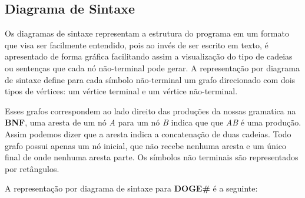 \documentclass{scrreprt}
\begin{document}
\subsection{Diagrama de Sintaxe}
Os diagramas de sintaxe representam a estrutura do programa em 
um formato que visa ser facilmente entendido, 
pois ao invés de ser escrito em texto, é apresentado de forma gráfica
facilitando assim a visualização do tipo de cadeias ou sentenças que 
cada nó não-terminal pode gerar. A representação por diagrama de sintaxe 
define para cada símbolo não-terminal um grafo direcionado com dois tipos de 
vértices: um vértice terminal e um vértice não-terminal. \par Esses grafos 
correspondem ao lado direito das produções da nossas gramatica na 
\textbf{BNF}, uma aresta de um nó \textit{A} para um nó \textit{B} indica que
que \textit{AB} é uma produção. Assim podemos dizer que a aresta indica a 
concatenação de duas cadeias. Todo grafo possui apenas um nó inicial, que 
não recebe nenhuma aresta e um único final de onde nenhuma aresta parte. Os símbolos não terminais são representados por retângulos.\par A representação por diagrama de sintaxe
para \textbf{DOGE\#} é a seguinte:
\end{document}
